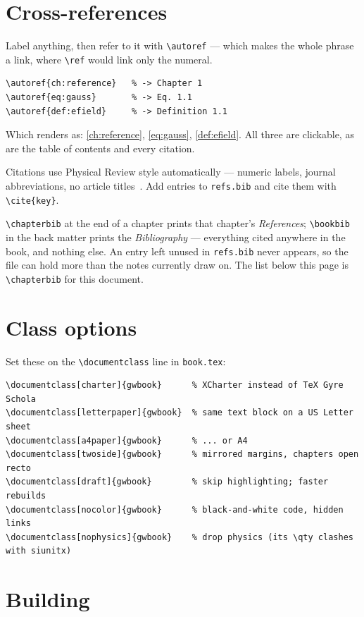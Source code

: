 \section{Cross-references}

Label anything, then refer to it with \verb|\autoref| --- which makes the whole
phrase a link, where \verb|\ref| would link only the numeral.

\begin{verbatim}
\autoref{ch:reference}   % -> Chapter 1
\autoref{eq:gauss}       % -> Eq. 1.1
\autoref{def:efield}     % -> Definition 1.1
\end{verbatim}

\noindent
Which renders as: \autoref{ch:reference}, \autoref{eq:gauss},
\autoref{def:efield}. All three are clickable, as are the table of contents and
every citation.

Citations use Physical Review style automatically --- numeric labels, journal
abbreviations, no article titles~\cite{Jackson1998,Feynman1949}. Add entries to
\texttt{refs.bib} and cite them with \verb|\cite{key}|.

\verb|\chapterbib| at the end of a chapter prints that chapter's
\emph{References}; \verb|\bookbib| in the back matter prints the
\emph{Bibliography} --- everything cited anywhere in the book, and nothing else.
An entry left unused in \texttt{refs.bib} never appears, so the file can hold
more than the notes currently draw on. The list below this page is
\verb|\chapterbib| for this document.

\section{Class options}

Set these on the \verb|\documentclass| line in \texttt{book.tex}:

\begin{verbatim}
\documentclass[charter]{gwbook}      % XCharter instead of TeX Gyre Schola
\documentclass[letterpaper]{gwbook}  % same text block on a US Letter sheet
\documentclass[a4paper]{gwbook}      % ... or A4
\documentclass[twoside]{gwbook}      % mirrored margins, chapters open recto
\documentclass[draft]{gwbook}        % skip highlighting; faster rebuilds
\documentclass[nocolor]{gwbook}      % black-and-white code, hidden links
\documentclass[nophysics]{gwbook}    % drop physics (its \qty clashes with siunitx)
\end{verbatim}

\section{Building}

